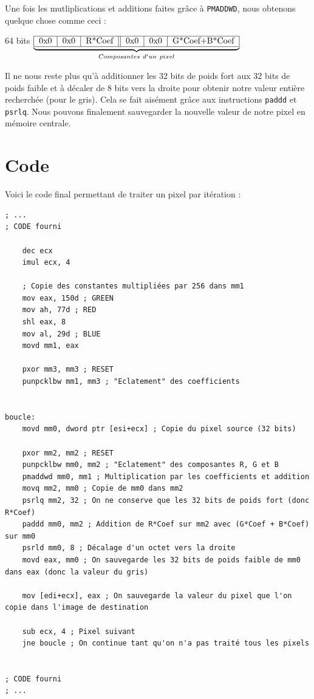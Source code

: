 \medskip

Une fois les mutliplications et additions faites grâce à \lstinline{PMADDWD}, nous obtenons quelque chose comme ceci :
\begin{center}
64 bits $\underbrace{
    \begin{tabular}{|c|c|c|c||c|c|c|c|}
    \hline
    0x0 & 0x0 & \multicolumn{2}{c||}{R*Coef} & 0x0 & 0x0 & \multicolumn{2}{c|}{G*Coef+B*Coef} \\
    \hline
    \end{tabular}}_{Composantes\ d'un\ pixel}$
\end{center}

Il ne nous reste plus qu'à additionner les 32 bits de poids fort aux 32 bits de poids faible et à décaler de 8 bits vers la droite pour obtenir notre valeur entière recherchée (pour le gris). Cela se fait aisément grâce aux instructions \lstinline{paddd} et \lstinline{psrlq}. Nous pouvons finalement sauvegarder la nouvelle valeur de notre pixel en mémoire centrale.

\section{Code}

Voici le code final permettant de traiter un pixel par itération :

\assembly
\begin{lstlisting}
; ...
; CODE fourni

    dec ecx
    imul ecx, 4

    ; Copie des constantes multipliées par 256 dans mm1
    mov eax, 150d ; GREEN
    mov ah, 77d ; RED
    shl eax, 8
    mov al, 29d ; BLUE
    movd mm1, eax

    pxor mm3, mm3 ; RESET
    punpcklbw mm1, mm3 ; "Eclatement" des coefficients


boucle:
    movd mm0, dword ptr [esi+ecx] ; Copie du pixel source (32 bits)
    
    pxor mm2, mm2 ; RESET
    punpcklbw mm0, mm2 ; "Eclatement" des composantes R, G et B
    pmaddwd mm0, mm1 ; Multiplication par les coefficients et addition
    movq mm2, mm0 ; Copie de mm0 dans mm2
    psrlq mm2, 32 ; On ne conserve que les 32 bits de poids fort (donc R*Coef)
    paddd mm0, mm2 ; Addition de R*Coef sur mm2 avec (G*Coef + B*Coef) sur mm0
    psrld mm0, 8 ; Décalage d'un octet vers la droite
    movd eax, mm0 ; On sauvegarde les 32 bits de poids faible de mm0 dans eax (donc la valeur du gris)

    mov [edi+ecx], eax ; On sauvegarde la valeur du pixel que l'on copie dans l'image de destination

    sub ecx, 4 ; Pixel suivant
    jne boucle ; On continue tant qu'on n'a pas traité tous les pixels


; CODE fourni
; ...
\end{lstlisting}

